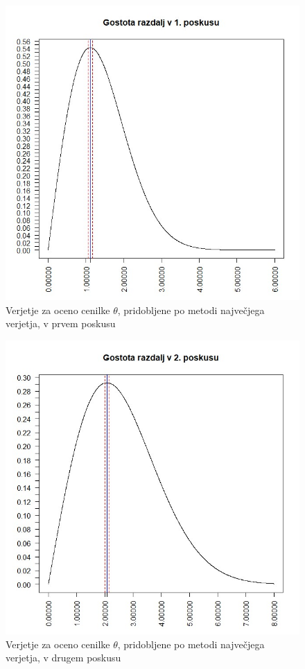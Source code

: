 \documentclass[a4paper, 10pt]{article}
\begin{document}
	\begin{figure}[h!]
		\label{fig: 2Dplot1}
		\centering
		\includegraphics[scale = 0.375]{VerjetjeMNV1}
		\caption{Verjetje za oceno cenilke $\theta$, pridobljene po metodi največjega verjetja, v prvem poskusu}
	\end{figure}

	\begin{figure}[h!]
		\label{fig: 2Dplot2}
		\centering
		\includegraphics[scale = 0.375]{VerjetjeMNV2}
		\caption{Verjetje za oceno cenilke $\theta$, pridobljene po metodi največjega verjetja, v drugem poskusu}
	\end{figure}
\end{document}

